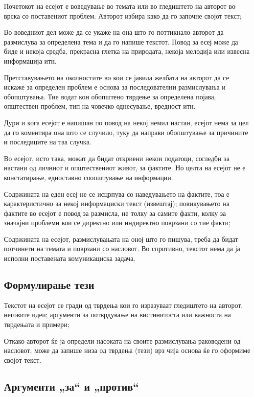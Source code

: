 \documentclass[12pt,a4paper]{article}
\begin{document}
Почетокот на есејот е воведување во темата или во гле­диштето на авторот во
врска со поставениот проблем. Ав­торот избира како да го започне својот текст;

Во воведниот дел може да се укаже на она што го поттикна­ло авторот да
размислува за определена тема и да го на­пише текстот. Повод за есеј може да
биде и некоја средба, прекрасна глетка на природата, некоја мелодија или извесна
информација итн.
 
 Претставувањето на околностите во кои се јавила желба­та на авторот да се
искаже за определен проблем е осно­ва за последователни размислувања и
обопштувања. Тие водат кон обопштено тврдење за определена појава, општествен
проблем, тип на човечко однесување, вредност итн.

 Дури и кога есејот е напишан по повод на некој немил нас­тан, есејот нема за
цел да го коментира она што се случило, туку да направи обопштување за причините
и последиците на таа случка.

Во есејот, исто така, можат да бидат откриени некои подато­ци, согледби за
настани од личниот и општествениот живот, за фактите. Но целта на есејот не е
констатирање, едностав­но соопштување на информации.

Содржината на еден есеј не се исцрпува со наведувањето на фактите, тоа е
карактеристично за некој информацис­ки текст (извештај); повикувањето на фактите
во есејот е повод за размисла, не толку за самите факти, колку за значајни
проблеми кои се директно или индиректно поврзани со тие факти;

Содржината на есејот, размислувањата на оној што го пи­шува, треба да бидат
потчинети на темата и поврзани со насловот. Во спротивно, текстот нема да ја
исполни поставе­ната комуникациска задача. 

\subsection{Формулирање тези}

 Текстот на есејот се гради од тврдења кои го изразуваат гледиштето на авторот,
 неговите идеи; аргументи за потвр­дување на вистинитоста или важноста на тврдењата и
примери;
 
Откако авторот ќе ја определи насоката на своите размислу­вања раководени од
насловот, може да запише низа од тврдења (тези) врз чија основа ќе го оформиме
својот текст.

\subsection{Аргументи „за“ и „против“}
\end{document}

